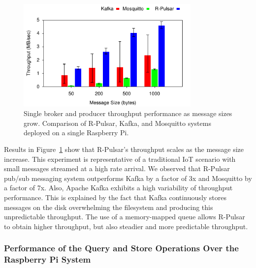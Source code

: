 
\begin{figure}[h]
  \includegraphics[width=0.8\textwidth]{Results/ProducerBar}
    \caption{Single broker and producer throughput performance as message sizes grow. Comparison of R-Pulsar, Kafka, and Mosquitto systems deployed on a single Raspberry Pi.}
  \label{fig:ProducerBar}
\end{figure}

Results in Figure~\ref{fig:ProducerBar} show that R-Pulsar's throughput scales as the message size increase. This experiment is representative of a traditional IoT scenario with small messages streamed at a high rate arrival.
We observed that R-Pulsar pub/sub messaging system outperforms Kafka by a factor of 3x and Mosquitto by a factor of 7x. Also, Apache Kafka exhibits a high variability of throughput performance. 
This is explained by the fact that Kafka continuously stores messages on the disk overwhelming the filesystem and producing this unpredictable throughput.
The use of a memory-mapped queue allows R-Pulsar to obtain higher throughput, but also steadier and more predictable throughput.

\hfill\vspace{0.1ex}
\subsubsection{Performance of the Query and Store Operations Over the Raspberry Pi System}
\hfill\vspace{1ex}

